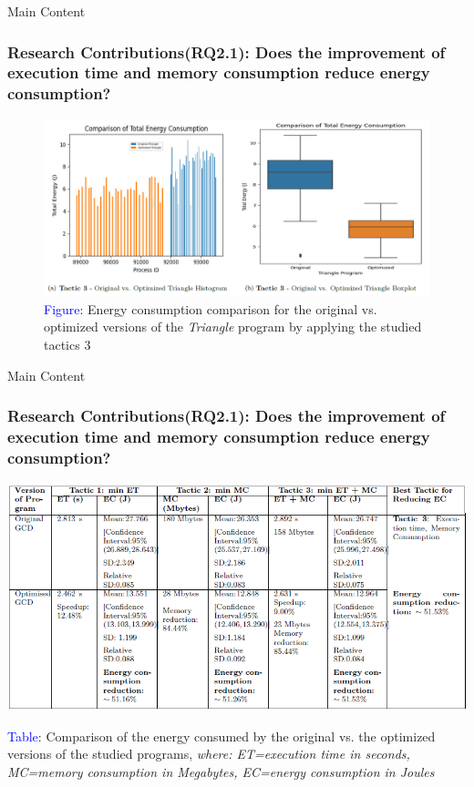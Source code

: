 \documentclass{beamer}
\begin{document}
\begin{frame}{Main Content}
  \frametitle{Research Contributions(RQ2.1): Does the improvement of execution time and memory consumption reduce energy consumption?}

  \begin{figure}
    \centering
    \includegraphics[width=1\textwidth]{figures/Hiegest_Triangle.png}
    \caption*{\scriptsize{\textcolor{blue}{Figure}: Energy consumption comparison for the original vs. optimized versions of the \textit{Triangle} program by applying the studied tactics 3}}
 \end{figure}
 
\end{frame}


\begin{frame}{Main Content}
  \frametitle{Research Contributions(RQ2.1): Does the improvement of execution time and memory consumption reduce energy consumption?}
  \vspace{-.2cm}
  \begin{table}
    \centering
    \includegraphics[width=\textwidth]{figures/Result_table_f_1.png}
    \caption*{\tiny{\textcolor{blue}{Table}: Comparison of the energy consumed by the original vs. the optimized versions of the studied programs, \textit{where: ET=execution time in seconds, MC=memory consumption in Megabytes, EC=energy consumption in Joules}}}
  \end{table}
\end{frame}
\end{document}

